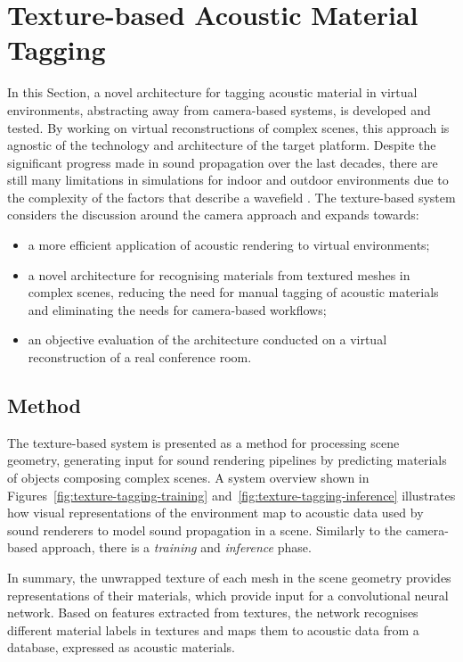 \section{Texture-based Acoustic Material Tagging}\label{sec:texture-tagging}
In this Section, a novel architecture for tagging acoustic material in virtual environments, abstracting away from camera-based systems, is developed and tested. By working on virtual reconstructions of complex scenes, this approach is agnostic of the technology and architecture of the target platform. Despite the significant progress made in sound propagation over the last decades, there are still many limitations in simulations for indoor and outdoor environments due to the complexity of the factors that describe a wavefield \citep{liu2020sound}. The texture-based system considers the discussion around the camera approach and expands towards:
\begin{itemize}
    \item a more efficient application of acoustic rendering to virtual environments;
    \item a novel architecture for recognising materials from textured meshes in complex scenes, reducing the need for manual tagging of acoustic materials and eliminating the needs for camera-based workflows; 
    \item an objective evaluation of the architecture conducted on a virtual reconstruction of a real conference room.
\end{itemize}

\subsection{Method}
The texture-based system is presented as a method for processing scene geometry, generating input for sound rendering pipelines by predicting materials of objects composing complex scenes. A system overview shown in Figures~\ref{fig:texture-tagging-training} and~\ref{fig:texture-tagging-inference} illustrates how visual representations of the environment map to acoustic data used by sound renderers to model sound propagation in a scene. Similarly to the camera-based approach, there is a \emph{training} and \emph{inference} phase.\par
In summary, the unwrapped texture of each mesh in the scene geometry provides representations of their materials, which provide input for a convolutional neural network. Based on features extracted from textures, the network recognises different material labels in textures and maps them to acoustic data from a database, expressed as acoustic materials.

